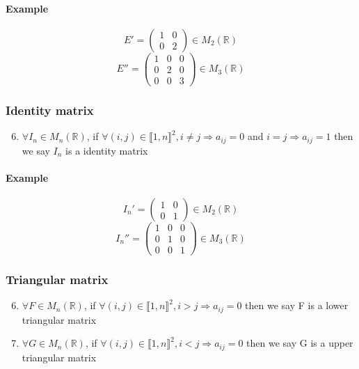 \documentclass[notitlepage]{math}
\begin{document}
    \paragraph{Example}
    \[ E' = \begin{pmatrix}
        1 & 0 \\
        0 & 2
    \end{pmatrix} \in M_{2}(\mathbb{R})\]
    \[ E'' = \begin{pmatrix}
        1 & 0 & 0 \\
        0 & 2 & 0 \\
        0 & 0 & 3
    \end{pmatrix} \in M_{3}(\mathbb{R})\]
\subsubsection{Identity matrix}
    \begin{enumerate}
        \setcounter{enumi}{5}
        \item $\forall I_n \in M_{n}(\mathbb{R})$, if $\forall (i,j) \in \llbracket 1,n \rrbracket ^2, i \ne j \Rightarrow  a_{ij} = 0$ and $i = j \Rightarrow a_{ij} = 1$ then we say $I_n$ is a identity matrix
    \end{enumerate}
    \paragraph{Example}
    \[ I_n' = \begin{pmatrix}
        1 & 0 \\
        0 & 1
    \end{pmatrix} \in M_{2}(\mathbb{R})\]
    \[ I_n'' = \begin{pmatrix}
        1 & 0 & 0 \\
        0 & 1 & 0 \\
        0 & 0 & 1
    \end{pmatrix} \in M_{3}(\mathbb{R})\]



\subsubsection{Triangular matrix}
    \begin{enumerate}
        \setcounter{enumi}{5}
        \item $\forall F \in M_{n}(\mathbb{R})$, if $\forall (i,j) \in \llbracket 1,n \rrbracket ^2, i > j \Rightarrow a_{ij} = 0$ then we say F is a lower triangular matrix
        \item $\forall G \in M_{n}(\mathbb{R})$, if $\forall (i,j) \in \llbracket 1,n \rrbracket ^2, i < j \Rightarrow a_{ij} = 0$ then we say G is a upper triangular matrix
    \end{enumerate}
\end{document}
